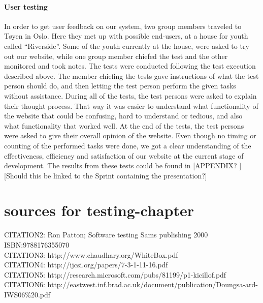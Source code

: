\paragraph{User testing}
In order to get user feedback on our system, two group members traveled to Tøyen in Oslo. Here they met up with possible end-users, at a house for youth called “Riverside”. Some of the youth currently at the house, were asked to try out our website, while one group member chiefed the test and the other monitored and took notes. The tests were conducted following the test execution described above. The member chiefing the tests gave instructions of what the test person should do, and then letting the test person perform the given tasks without assistance. During all of the tests, the test persons were asked to explain their thought process. That way it was easier to understand what functionality of the website that could be confusing, hard to understand or tedious, and also what functionality that worked well. At the end of the tests, the test persons were asked to give their overall opinion of the website. Even though no timing or counting of the performed tasks were done, we got a clear understanding of the effectiveness, efficiency and satisfaction of our website at the current stage of development. The results from these tests could be found in [APPENDIX? ] [Should this be linked to the Sprint containing the presentation?]


\section{sources for testing-chapter} 
CITATION2: Ron Patton; Software testing Sams publishing 2000 ISBN:9788176355070 \\
CITATION3: http://www.chaudhary.org/WhiteBox.pdf \\
CITATION4: http://ijcsi.org/papers/7-3-1-11-16.pdf \\
CITATION5: http://research.microsoft.com/pubs/81199/p1-kicillof.pdf \\
CITATION6: http://eastwest.inf.brad.ac.uk/document/publication/Doungsa-ard-IWS06\%20.pdf \\